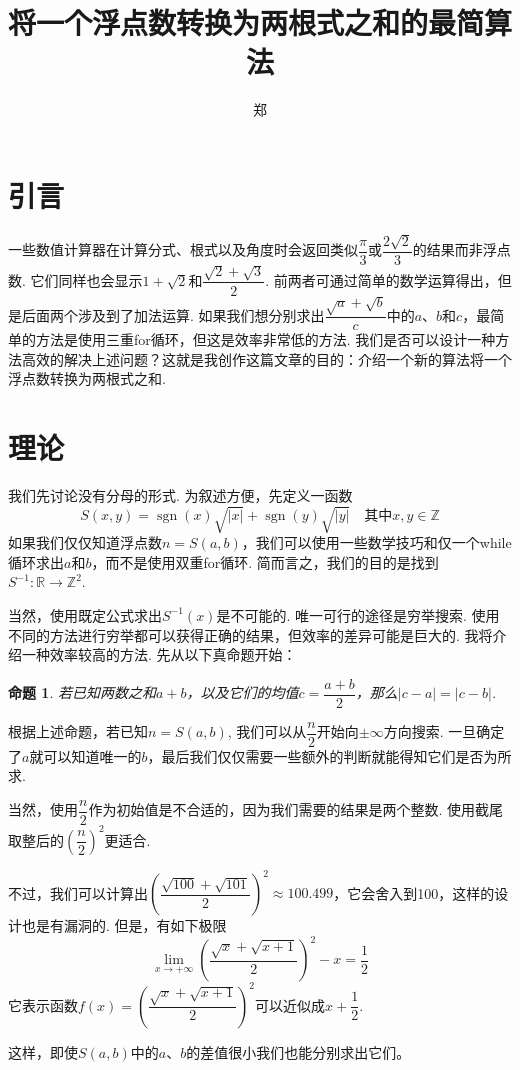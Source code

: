 \documentclass[a4paper, UTF8]{ctexart}
\title{将一个浮点数转换为两根式之和的最简算法}
\author{郑}
\newtheorem{proposition}{命题}
\DeclareMathOperator{\sgn}{\mathrm{sgn}}
\begin{document}
\maketitle

\section{引言}
一些数值计算器在计算分式、根式以及角度时会返回类似$\dfrac{\pi}{3}$或$\dfrac{2\sqrt{2}}{3}$的结果而非浮点数. 它们同样也会显示$1+\sqrt{2}$和$\dfrac{\sqrt{2}+\sqrt{3}}{2}$. 前两者可通过简单的数学运算得出，但是后面两个涉及到了加法运算. 如果我们想分别求出$\dfrac{\sqrt{a}+\sqrt{b}}{c}$中的$a$、$b$和$c$，最简单的方法是使用三重for循环，但这是效率非常低的方法. 我们是否可以设计一种方法高效的解决上述问题？这就是我创作这篇文章的目的：介绍一个新的算法将一个浮点数转换为两根式之和.

\section{理论}
我们先讨论没有分母的形式. 为叙述方便，先定义一函数\[S(x,y)=\sgn(x)\sqrt{|x|}+\sgn(y)\sqrt{|y|} \quad\mbox{其中}x,y\in\mathbb{Z}\]如果我们仅仅知道浮点数$n=S(a,b)$，我们可以使用一些数学技巧和仅一个while循环求出$a$和$b$，而不是使用双重for循环. 简而言之，我们的目的是找到$S^{-1}:\mathbb{R}\to\mathbb{Z}^2$.

当然，使用既定公式求出$S^{-1}(x)$是不可能的. 唯一可行的途径是穷举搜索. 使用不同的方法进行穷举都可以获得正确的结果，但效率的差异可能是巨大的. 我将介绍一种效率较高的方法. 先从以下真命题开始：
\begin{proposition}
    若已知两数之和$a+b$，以及它们的均值$c=\dfrac{a+b}{2}$，那么$|c-a|=|c-b|$. 
\end{proposition}
根据上述命题，若已知$n=S(a,b)$, 我们可以从$\dfrac{n}{2}$开始向$\pm\infty$方向搜索. 一旦确定了$a$就可以知道唯一的$b$，最后我们仅仅需要一些额外的判断就能得知它们是否为所求.

当然，使用$\dfrac{n}{2}$作为初始值是不合适的，因为我们需要的结果是两个整数. 使用截尾取整后的$\left(\dfrac{n}{2}\right)^2$更适合.

不过，我们可以计算出$\left(\dfrac{\sqrt{100}+\sqrt{101}}{2}\right)^2\approx100.499$，它会舍入到100，这样的设计也是有漏洞的. 但是，有如下极限\[\lim_{x\to+\infty}\left(\frac{\sqrt{x}+\sqrt{x+1}}{2}\right)^2-x=\frac{1}{2}\]它表示函数$f(x)=\left(\dfrac{\sqrt{x}+\sqrt{x+1}}{2}\right)^2$可以近似成$x+\dfrac{1}{2}$.

这样，即使$S(a,b)$中的$a$、$b$的差值很小我们也能分别求出它们。
\end{document}
